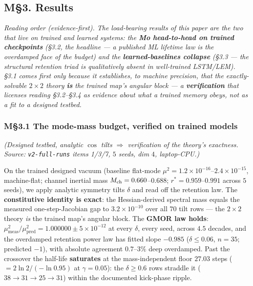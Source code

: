 \documentclass[10pt]{article}
\begin{document}
\subsection*{M\S3. Results}

\emph{Reading order (evidence-first). The load-bearing results of this paper are the two that live on trained and learned systems: the \textbf{Mo head-to-head on trained checkpoints} (\S3.2, the headline --- a published ML lifetime law is the overdamped face of the budget) and the \textbf{learned-baselines collapse} (\S3.3 --- the structural retention triad is qualitatively absent in well-trained LSTM/LEM). \S3.1 comes first only because it establishes, to machine precision, that the exactly-solvable $2\times2$ theory \textbf{is} the trained map's angular block --- a \textbf{verification} that licenses reading \S3.2--\S3.4 as evidence about what a trained memory obeys, not as a fit to a designed testbed.}

\subsubsection*{M\S3.1 The mode-mass budget, verified on trained models}

\emph{(Designed testbed, analytic $\cos$ tilts $\Rightarrow$ verification of the theory's exactness. Source: \texttt{v2-full-runs} items 1/3/7, $5$ seeds, dim $4$, laptop-CPU.)}

On the trained designed vacuum (baseline flat-mode $\mu^2=1.2\!\times\!10^{-16}$--$2.4\!\times\!10^{-15}$, machine-flat; channel inertial mass $M_{\rm ch}=0.660$--$0.688$; $r^*=0.959$--$0.991$ across $5$ seeds), we apply analytic symmetry tilts $\delta$ and read off the retention law. The \textbf{constitutive identity is exact}: the Hessian-derived spectral mass equals the measured one-step-Jacobian gap to $3.2\!\times\!10^{-10}$ over all $70$ tilt rows --- the $2\times2$ theory \emph{is} the trained map's angular block. The \textbf{GMOR law holds}: $\mu^2_{\mathrm{meas}}/\mu^2_{\mathrm{pred}}=1.000000\pm5\!\times\!10^{-12}$ at every $\delta$, every seed, across $4.5$ decades, and the overdamped retention power law has fitted slope $-0.985$ ($\delta\le0.06$, $n=35$; predicted $-1$), with absolute agreement $0.7$--$3\%$ deep overdamped. Past the crossover the half-life \textbf{saturates} at the mass-independent floor $27.03$ steps ($=2\ln2/(-\ln0.95)$ at $\gamma=0.05$): the $\delta\ge0.6$ rows straddle it ($38\to31\to25\to31$) within the documented kick-phase ripple.
\end{document}

